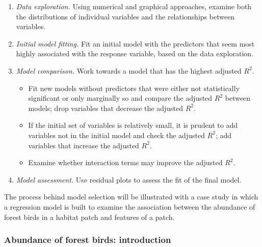 \begin{enumerate}
	\item \textit{Data exploration.} Using numerical and graphical approaches, examine both the distributions of individual variables and the relationships between variables.
	
	\item \textit{Initial model fitting.} Fit an initial model with the predictors that seem most highly associated with the response variable, based on the data exploration.
	
	\item \textit{Model comparison.} Work towards a model that has the highest adjusted $R^2$.
	
	\begin{itemize}
		\item Fit new models without predictors that were either not statistically significant or only marginally so and compare the adjusted $R^2$ between models; drop variables that decrease the adjusted $R^2$. 
		
		\item If the initial set of variables is relatively small, it is prudent to add variables not in the initial model and check the adjusted $R^2$; add variables that increase the adjusted $R^2$.
		
		\item Examine whether interaction terms may improve the adjusted $R^2$.
	\end{itemize}
	
	\item \textit{Model assessment.} Use residual plots to assess the fit of the final model. 
	
\end{enumerate}

The process behind model selection will be illustrated with a case study in which a regression model is built to examine the association between the abundance of forest birds in a habitat patch and features of a patch. 


\subsubsection{Abundance of forest birds: introduction}

